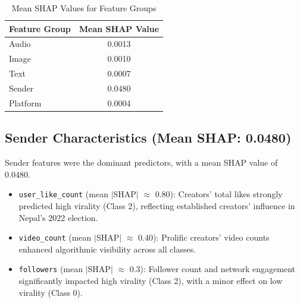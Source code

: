 \documentclass[12pt,a4paper]{report}
\begin{document}
\begin{table}[h]
    \centering
    \caption{Mean SHAP Values for Feature Groups}
    \label{tab:shap_values}
    \begin{tabular}{l S[table-format=1.4]}
        \toprule
        \textbf{Feature Group} & {\textbf{Mean SHAP Value}} \\
        \midrule
        Audio  & 0.0013 \\
        Image  & 0.0010 \\
        Text   & 0.0007 \\
        Sender & 0.0480 \\
        Platform & 0.0004 \\
        \bottomrule
    \end{tabular}
\end{table}

\subsection{Sender Characteristics (Mean SHAP: 0.0480)}
Sender features were the dominant predictors, with a mean SHAP value of 0.0480.
\begin{itemize}
    \item \texttt{user\_like\_count} (mean $|$SHAP$|$ $\approx$ 0.80): Creators’ total likes strongly predicted high virality (Class 2), reflecting established creators’ influence in Nepal’s 2022 election.
    \item \texttt{video\_count} (mean $|$SHAP$|$ $\approx$ 0.40): Prolific creators’ video counts enhanced algorithmic visibility across all classes.
    \item \texttt{followers} (mean $|$SHAP$|$ $\approx$ 0.3): Follower count and network engagement significantly impacted high virality (Class 2), with a minor effect on low virality (Class 0).
\end{itemize}
\end{document}
